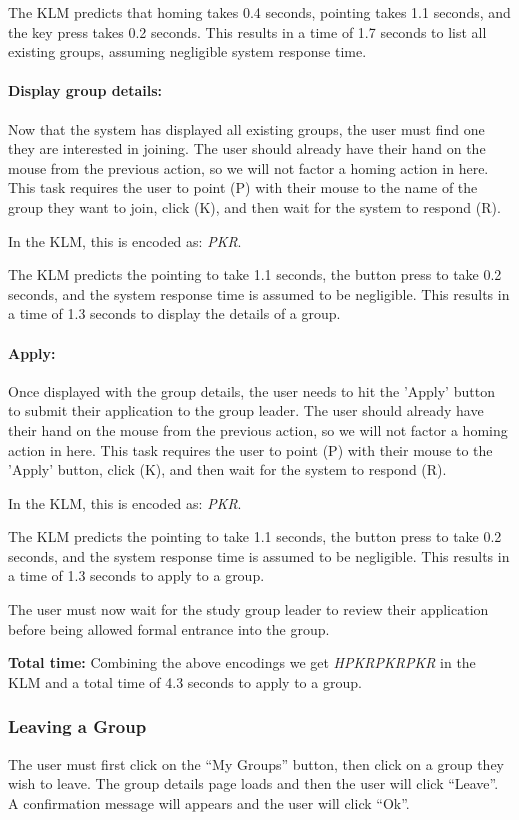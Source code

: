 \documentclass[conference]{IEEEtran}
\begin{document}
The KLM predicts that homing takes 0.4 seconds, pointing takes 1.1 seconds, and the key press takes 0.2 seconds.
This results in a time of 1.7 seconds to list all existing groups, assuming negligible system response time.

\paragraph{Display group details:}
Now that the system has displayed all existing groups, the user must find one they are interested in joining.
The user should already have their hand on the mouse from the previous action, so we will not factor a homing action in here.
This task requires the user to point (P) with their mouse to the name of the group they want to join, click (K), and then wait for the system to respond (R).

In the KLM, this is encoded as: \emph{PKR}.

The KLM predicts the pointing to take 1.1 seconds, the button press to take 0.2 seconds, and the system response time is assumed to be negligible.
This results in a time of 1.3 seconds to display the details of a group.

\paragraph{Apply:}
Once displayed with the group details, the user needs to hit the 'Apply' button to submit their application to the group leader.
The user should already have their hand on the mouse from the previous action, so we will not factor a homing action in here.
This task requires the user to point (P) with their mouse to the 'Apply' button, click (K), and then wait for the system to respond (R).

In the KLM, this is encoded as: \emph{PKR}.

The KLM predicts the pointing to take 1.1 seconds, the button press to take 0.2 seconds, and the system response time is assumed to be negligible.
This results in a time of 1.3 seconds to apply to a group.

The user must now wait for the study group leader to review their application before being allowed formal entrance into the group.

\textbf{Total time:}
Combining the above encodings we get \emph{HPKRPKRPKR} in the KLM and a total time of 4.3 seconds to apply to a group.

\subsubsection{Leaving a Group}
The user must first click on the ``My Groups'' button, then click on a group they wish to leave.  The group details page loads and then the user will click ``Leave''.  A confirmation message will appears and the user will click ``Ok''.
\end{document}
